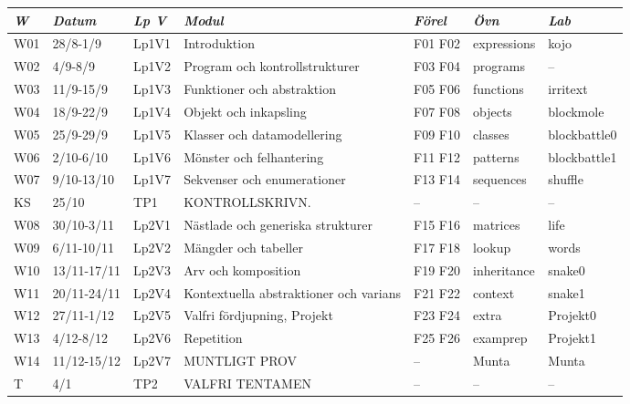 \begin{tabular}{l|l|l|l|l|l|l}
\textit{W} & \textit{Datum} & \textit{Lp V} & \textit{Modul} & \textit{Förel} & \textit{Övn} & \textit{Lab} \\ \hline \hline
W01 & 28/8-1/9 & Lp1V1 & Introduktion & F01 F02 & expressions & kojo \\
W02 & 4/9-8/9 & Lp1V2 & Program och kontrollstrukturer & F03 F04 & programs & -- \\
W03 & 11/9-15/9 & Lp1V3 & Funktioner och abstraktion & F05 F06 & functions & irritext \\
W04 & 18/9-22/9 & Lp1V4 & Objekt och inkapsling & F07 F08 & objects & blockmole \\
W05 & 25/9-29/9 & Lp1V5 & Klasser och datamodellering & F09 F10 & classes & blockbattle0 \\
W06 & 2/10-6/10 & Lp1V6 & Mönster och felhantering & F11 F12 & patterns & blockbattle1 \\
W07 & 9/10-13/10 & Lp1V7 & Sekvenser och enumerationer & F13 F14 & sequences & shuffle \\
KS & 25/10 & TP1 & KONTROLLSKRIVN. & -- & -- & -- \\
W08 & 30/10-3/11 & Lp2V1 & Nästlade och generiska strukturer & F15 F16 & matrices & life \\
W09 & 6/11-10/11 & Lp2V2 & Mängder och tabeller & F17 F18 & lookup & words \\
W10 & 13/11-17/11 & Lp2V3 & Arv och komposition & F19 F20 & inheritance & snake0 \\
W11 & 20/11-24/11 & Lp2V4 & Kontextuella abstraktioner och varians & F21 F22 & context & snake1 \\
W12 & 27/11-1/12 & Lp2V5 & Valfri fördjupning, Projekt & F23 F24 & extra & Projekt0 \\
W13 & 4/12-8/12 & Lp2V6 & Repetition & F25 F26 & examprep & Projekt1 \\
W14 & 11/12-15/12 & Lp2V7 & MUNTLIGT PROV & -- & Munta & Munta \\
T & 4/1 & TP2 & VALFRI TENTAMEN & -- & -- & -- \\
\end{tabular}
